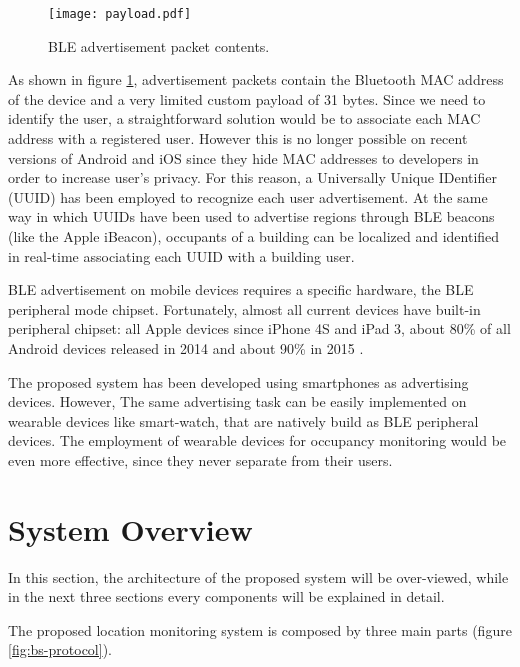 \begin{figure}[h!tb]
\centering
\texttt{[image: payload.pdf]}
\caption[BLE advertisement packet contents.]{BLE advertisement packet contents.}
\label{fig:payload}
\end{figure}

As shown in figure \ref{fig:payload}, advertisement packets contain the Bluetooth MAC address of the device and a very limited custom payload of 31 bytes. Since we need to identify the user, a straightforward solution would be to associate each MAC address with a registered user. However this is no longer possible on recent versions of Android and iOS since they hide MAC addresses to developers in order to increase user's privacy. For this reason, a Universally Unique IDentifier (UUID) has been employed to recognize each user advertisement.
At the same way in which UUIDs have been used to advertise regions through BLE beacons (like the Apple iBeacon), occupants of a building can be localized and identified in real-time associating each UUID with a building user.

BLE advertisement on mobile devices requires a specific hardware, the BLE peripheral mode chipset. Fortunately, almost all current devices have built-in peripheral chipset: all Apple devices since iPhone 4S and iPad 3, about 80\% of all Android devices released in 2014 and about 90\% in 2015 \cite{RadiusNetwork2016}.

The proposed system has been developed using smartphones as advertising devices. However, The same advertising task can be easily implemented on wearable devices like smart-watch, that are natively build as BLE peripheral devices. The employment of wearable devices for occupancy monitoring would be even more effective, since they never separate from their users.

\section{System Overview}
\label{sec:overview}
In this section, the architecture of the proposed system will be over-viewed, while in the next three sections every components will be explained in detail.

The proposed location monitoring system is composed by three main parts (figure \ref{fig:bs-protocol}).

